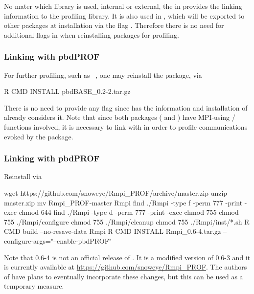 No mater which library is used, internal or external, the 
in  provides the linking information to the
profiling library. It is also used in , which will be
exported to other  packages at installation via the flag
.  Therefore there is no need for additional flags in
 when reinstalling packages for profiling.



\subsubsection{Linking  with pbdPROF}
\label{sec:pbdBASE}

For further profiling, such as ~\citep{Schmidt2012pbdBASEpackage}, one may
reinstall the package, via
\begin{Command}
R CMD INSTALL pbdBASE_0.2-2.tar.gz
\end{Command}
There is no need to provide any flag since  has the
information and installation of  already considers it.
Note that since both packages ( and )
have MPI-using / functions involved, it
is necessary to link with  in order to profile communications
evoked by the package.



\subsubsection{Linking  with pbdPROF}
\label{sec:Rmpi}

Reinstall  via
\begin{Command}
wget https://github.com/snoweye/Rmpi_PROF/archive/master.zip
unzip master.zip
mv Rmpi_PROF-master Rmpi
find ./Rmpi -type f -perm 777 -print -exec chmod 644 {} \;
find ./Rmpi -type d -perm 777 -print -exec chmod 755 {} \;
chmod 755 ./Rmpi/configure
chmod 755 ./Rmpi/cleanup
chmod 755 ./Rmpi/inst/*.sh
R CMD build --no-resave-data Rmpi
R CMD INSTALL Rmpi_0.6-4.tar.gz --configure-args="--enable-pbdPROF"
\end{Command}
Note that {\color{red} 0.6-4} is not an official release of .
It is a modified version of 0.6-3 and it is currently available at
\url{https://github.com/snoweye/Rmpi_PROF}.  The authors of  have plans 
to eventually incorporate these changes, but this can be used as a temporary 
measure.






